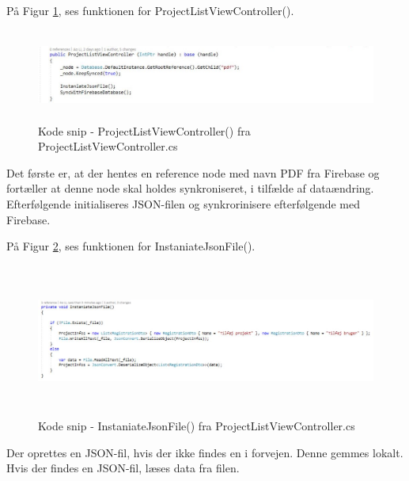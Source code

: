 På Figur \ref{fig:ProjectListViewController}, ses funktionen for ProjectListViewController().
\begin{figure}[H] %
	\centering
	\includegraphics[height=3cm, width=17cm]{../ArkitekturDesign/Design/ProjectList/ProjectListViewController}
	\caption{Kode snip - ProjectListViewController() fra ProjectListViewController.cs}
	\label{fig:ProjectListViewController}
\end{figure}
Det første er, at der hentes en reference node med navn PDF fra Firebase og fortæller at denne node skal holdes synkroniseret, i tilfælde af dataændring. \\
Efterfølgende initialiseres JSON-filen og synkrorinisere efterfølgende med Firebase.

På Figur \ref{fig:JSONFile}, ses funktionen for InstaniateJsonFile().
\begin{figure}[H] %
	\centering
	\includegraphics[height=5cm, width=15cm]{../ArkitekturDesign/Design/ProjectList/JSONFile}
	\caption{Kode snip - InstaniateJsonFile() fra ProjectListViewController.cs}
	\label{fig:JSONFile}
\end{figure}
Der oprettes en JSON-fil, hvis der ikke findes en i forvejen. Denne gemmes lokalt.\\
Hvis der findes en JSON-fil, læses data fra filen.

\clearpage

